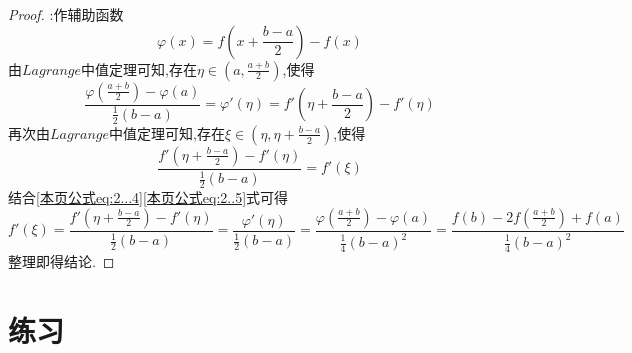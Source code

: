 \documentclass[lang=cn,newtx,10pt,scheme=chinese]{elegantbook}
\begin{document}
\begin{example}
\begin{proof}
        {\color{blue} }:作辅助函数
        \begin{equation}
            \varphi \left( x \right) =f\left( x+\frac{b-a}{2} \right) -f\left( x \right)
        \nonumber
        \end{equation}
        由$Lagrange$中值定理可知,存在$\eta \in \left( a,\frac{a+b}{2} \right)$,使得
        \begin{equation}\label{本页公式eq:2...4}
            \frac{\varphi \left( \frac{a+b}{2} \right) -\varphi \left( a \right)}{\frac{1}{2}\left( b-a \right)}=\varphi '\left( \eta \right) =f'\left( \eta +\frac{b-a}{2} \right) -f'\left( \eta \right) 
        \end{equation}
        再次由$Lagrange$中值定理可知,存在$\xi \in \left( \eta ,\eta +\frac{b-a}{2} \right)$,使得
        \begin{equation}\label{本页公式eq:2..5}
            \frac{f'\left( \eta +\frac{b-a}{2} \right) -f'\left( \eta \right)}{\frac{1}{2}\left( b-a \right)}=f'\left( \xi \right) 
        \end{equation}
        结合\eqref{本页公式eq:2...4}\eqref{本页公式eq:2..5}式可得
        \begin{equation}
            f'\left( \xi \right) =\frac{f'\left( \eta +\frac{b-a}{2} \right) -f'\left( \eta \right)}{\frac{1}{2}\left( b-a \right)}=\frac{\varphi '\left( \eta \right)}{\frac{1}{2}\left( b-a \right)}=\frac{\varphi \left( \frac{a+b}{2} \right) -\varphi \left( a \right)}{\frac{1}{4}\left( b-a \right) ^2}=\frac{f\left( b \right) -2f\left( \frac{a+b}{2} \right) +f\left( a \right)}{\frac{1}{4}\left( b-a \right) ^2}
            \nonumber
        \end{equation}
        整理即得结论.

    \end{proof}
\end{example}

\section{练习}
\end{document}
